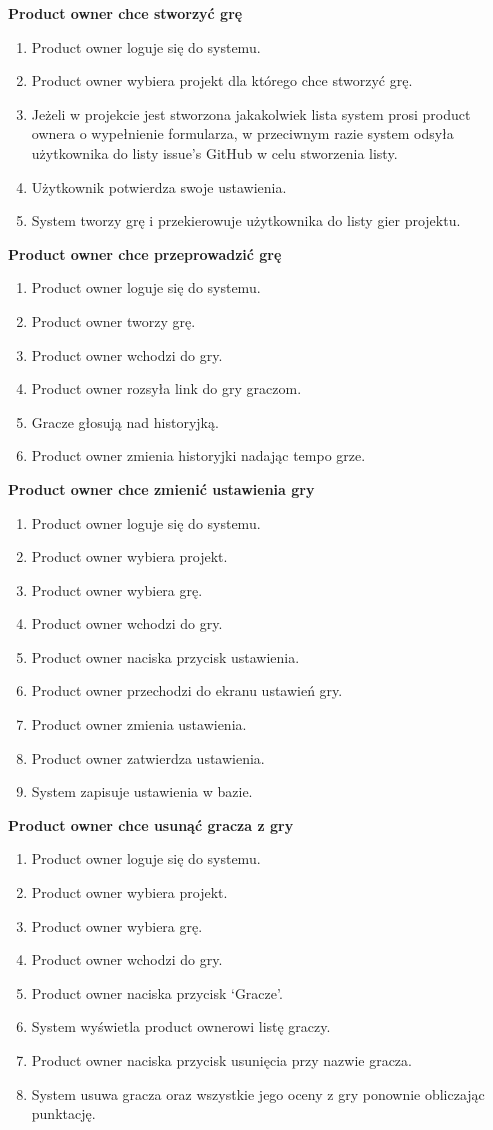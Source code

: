\textbf{Product owner chce stworzyć grę}
\begin{enumerate}
    \item Product owner loguje się do systemu.
    \item Product owner wybiera projekt dla którego chce stworzyć grę.
    \item Jeżeli w projekcie jest stworzona jakakolwiek lista system prosi product ownera o wypełnienie formularza,
    w przeciwnym razie system odsyła użytkownika do listy issue's GitHub w celu stworzenia listy.
    \item Użytkownik potwierdza swoje ustawienia.
    \item System tworzy grę i przekierowuje użytkownika do listy gier projektu.
\end{enumerate}
\textbf{Product owner chce przeprowadzić grę}
\begin{enumerate}
    \item Product owner loguje się do systemu.
    \item Product owner tworzy grę.
    \item Product owner wchodzi do gry.
    \item Product owner rozsyła link do gry graczom.
    \item Gracze głosują nad historyjką.
    \item Product owner zmienia historyjki nadając tempo grze.
\end{enumerate}
\textbf{Product owner chce zmienić ustawienia gry}
\begin{enumerate}
    \item Product owner loguje się do systemu.
    \item Product owner wybiera projekt.
    \item Product owner wybiera grę.
    \item Product owner wchodzi do gry.
    \item Product owner naciska przycisk ustawienia.
    \item Product owner przechodzi do ekranu ustawień gry.
    \item Product owner zmienia ustawienia.
    \item Product owner zatwierdza ustawienia.
    \item System zapisuje ustawienia w bazie.
\end{enumerate}
\textbf{Product owner chce usunąć gracza z gry}
\begin{enumerate}
    \item Product owner loguje się do systemu.
    \item Product owner wybiera projekt.
    \item Product owner wybiera grę.
    \item Product owner wchodzi do gry.
    \item Product owner naciska przycisk `Gracze'.
    \item System wyświetla product ownerowi listę graczy.
    \item Product owner naciska przycisk usunięcia przy nazwie gracza.
    \item System usuwa gracza oraz wszystkie jego oceny z gry ponownie obliczając punktację.
\end{enumerate}
